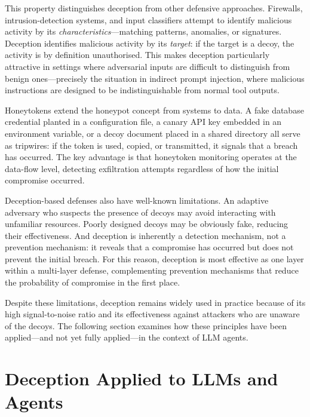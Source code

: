 This property distinguishes deception from other defensive approaches.  Firewalls, intrusion-detection systems, and input classifiers attempt to identify malicious activity by its \emph{characteristics}---matching patterns, anomalies, or signatures.  Deception identifies malicious activity by its \emph{target}: if the target is a decoy, the activity is by definition unauthorised.  This makes deception particularly attractive in settings where adversarial inputs are difficult to distinguish from benign ones---precisely the situation in indirect prompt injection, where malicious instructions are designed to be indistinguishable from normal tool outputs.

Honeytokens extend the honeypot concept from systems to data.  A fake database credential planted in a configuration file, a canary API key embedded in an environment variable, or a decoy document placed in a shared directory all serve as tripwires: if the token is used, copied, or transmitted, it signals that a breach has occurred.  The key advantage is that honeytoken monitoring operates at the data-flow level, detecting exfiltration attempts regardless of how the initial compromise occurred.

Deception-based defenses also have well-known limitations.  An adaptive adversary who suspects the presence of decoys may avoid interacting with unfamiliar resources.  Poorly designed decoys may be obviously fake, reducing their effectiveness.  And deception is inherently a detection mechanism, not a prevention mechanism: it reveals that a compromise has occurred but does not prevent the initial breach.  For this reason, deception is most effective as one layer within a multi-layer defense, complementing prevention mechanisms that reduce the probability of compromise in the first place.

Despite these limitations, deception remains widely used in practice because of its high signal-to-noise ratio and its effectiveness against attackers who are unaware of the decoys.  The following section examines how these principles have been applied---and not yet fully applied---in the context of LLM agents.


\section{Deception Applied to LLMs and Agents}
\label{sec:deception_ai}


